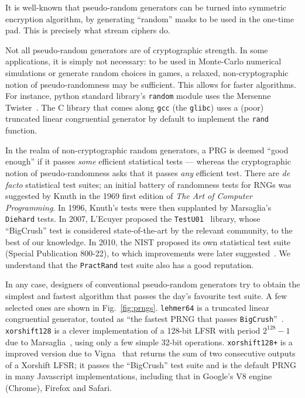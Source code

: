 \documentclass[submission,svgnames,journal=tosc]{iacrtrans}
\begin{document}
It is well-known that pseudo-random generators can be turned into symmetric
encryption algorithm, by generating ``random'' masks to be used in the one-time
pad. This is precisely what stream ciphers do.

Not all pseudo-random generators are of cryptographic strength. In some
applications, it is simply not necessary: to be used in Monte-Carlo numerical
simulations or generate random choices in games, a relaxed, non-cryptographic
notion of pseudo-randomness may be sufficient. This allows for faster
algorithms. For instance, \textsf{python} standard library's \texttt{random}
module uses the Mersenne Twister~\cite{MatsumotoN98}. The \textsf{C} library
that comes along \texttt{gcc} (the \texttt{glibc}) uses a (poor) truncated
linear congruential generator by default to implement the \texttt{rand}
function.

In the realm of non-cryptographic random generators, a PRG is deemed ``good
enough'' if it passes \emph{some} efficient statistical tests --- whereas the
cryptographic notion of pseudo-randomness asks that it passes \emph{any}
efficient test. There are \textit{de facto} statistical test suites; an initial
battery of randomness tests for RNGs was suggested by Knuth in the 1969 first
edition of \emph{The Art of Computer Programming}. In 1996, Knuth's tests were then
supplanted by Marsaglia's \texttt{Diehard} tests. In 2007, L'Ecuyer proposed
the \texttt{TestU01}~\cite{LEcuyerS07} library, whose ``BigCrush'' test is
considered state-of-the-art by the relevant community, to the best of our
knowledge. In 2010, the NIST proposed its own statistical test suite (Special
Publication 800-22), to which improvements were later
suggested~\cite{ZhuMLZJ16}. We understand that the \texttt{PractRand} test suite
also has a good reputation.

In any case, designers of conventional pseudo-random generators try to obtain
the simplest and fastest algorithm that passes the day's favourite test suite. A
few selected ones are shown in Fig.~\ref{fig:prngs}. \texttt{lehmer64} is a
truncated linear congruential generator, touted as ``the fastest PRNG that
passes \texttt{BigCrush}''~\cite{LemireLehmer}. \texttt{xorshift128} is a clever
implementation of a 128-bit LFSR with period $2^{128} - 1$ due to
Marsaglia~\cite{Marsaglia03}, using only a few simple 32-bit
operations. \texttt{xorshift128+} is a improved version due to
Vigna~\cite{Vigna17} that returns the sum of two consecutive outputs of a
Xorshift LFSR; it passes the ``BigCrush'' test suite and is the default PRNG in
many Javascript implementations, including that in Google's V8 engine (Chrome),
Firefox and Safari.
\end{document}

